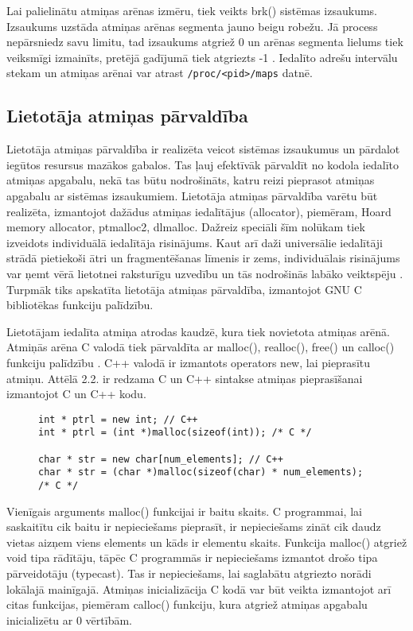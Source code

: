  Lai palielinātu atmiņas arēnas izmēru, tiek veikts brk() sistēmas izsaukums. Izsaukums uzstāda atmiņas arēnas segmenta jauno beigu robežu. 
 Jā process nepārsniedz savu limitu, tad izsaukums atgriež 0 un arēnas segmenta lielums tiek veiksmīgi izmainīts, pretējā gadījumā tiek atgriezts -1 \cite{LINMAN}.
 Iedalīto adrešu intervālu stekam un atmiņas arēnai var atrast \texttt{/proc/<pid>/maps} datnē.
 
 
 
\subsection{Lietotāja atmiņas pārvaldība}
Lietotāja atmiņas pārvaldība ir realizēta veicot sistēmas izsaukumus un pārdalot iegūtos resursus mazākos gabalos. 
Tas ļauj efektīvāk pārvaldīt no kodola iedalīto atmiņas apgabalu, nekā tas būtu nodrošināts, katru reizi pieprasot atmiņas apgabalu ar sistēmas izsaukumiem.
Lietotāja atmiņas pārvaldība varētu būt realizēta, izmantojot dažādus atmiņas iedalītājus (allocator), piemēram, Hoard memory allocator, ptmalloc2, dlmalloc.
Dažreiz speciāli šīm nolūkam tiek izveidots individuālā iedalītāja risinājums. 
Kaut arī daži universālie iedalītāji strādā pietiekoši ātri un fragmentēšanas līmenis ir zems, individuālais risinājums var ņemt vērā lietotnei raksturīgu uzvedību un tās nodrošinās labāko veiktspēju \cite{EDBG}.
Turpmāk tiks apskatīta lietotāja atmiņas pārvaldība, izmantojot GNU C bibliotēkas funkciju palīdzību.

Lietotājam iedalīta atmiņa atrodas kaudzē, kura tiek novietota atmiņas arēnā. 
Atmiņās arēna C valodā tiek pārvaldīta ar malloc(), realloc(), free() un calloc() funkciju palīdzību \cite {atparv}.
C++ valodā ir izmantots operators new, lai pieprasītu atmiņu.   
Attēlā 2.2. ir redzama C un C++ sintakse atmiņas pieprasīšanai izmantojot C un C++ kodu.
\begin{figure}[h]
\begin{lstlisting}
int * ptrl = new int; // C++
int * ptrl = (int *)malloc(sizeof(int)); /* C */

char * str = new char[num_elements]; // C++
char * str = (char *)malloc(sizeof(char) * num_elements); /* C */
\end{lstlisting}
\caption{\textbf{\fontsize{11}{12}\selectfont {Dinamiskās atmiņas iedalīšana C un C++}}}
\end{figure}
Vienīgais arguments malloc() funkcijai ir baitu skaits.
C programmai, lai saskaitītu cik baitu ir nepieciešams pieprasīt, ir nepieciešams zināt cik daudz vietas aizņem viens elements un kāds ir elementu skaits.
Funkcija malloc() atgriež void tipa rādītāju, tāpēc C programmās ir nepieciešams izmantot drošo tipa pārveidotāju (typecast). 
Tas ir nepieciešams, lai saglabātu atgriezto norādi lokālajā mainīgajā. Atmiņas inicializācija C kodā
var būt veikta izmantojot arī citas funkcijas, piemēram calloc() funkciju, kura atgriež atmiņas apgabalu inicializētu ar 0 vērtībām.




